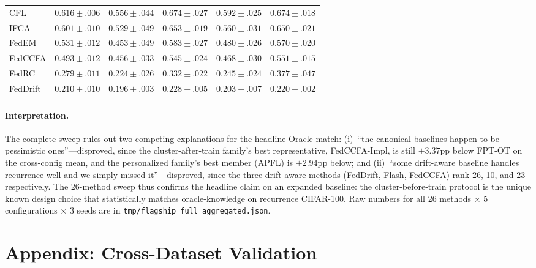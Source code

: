 \begin{table}[h]
\begin{tabular}{lrrrrr}
CFL               & $0.616 \pm .006$ & $0.556 \pm .044$ & $0.674 \pm .027$ & $0.592 \pm .025$ & $0.674 \pm .018$ \\
IFCA              & $0.601 \pm .010$ & $0.529 \pm .049$ & $0.653 \pm .019$ & $0.560 \pm .031$ & $0.650 \pm .021$ \\
FedEM             & $0.531 \pm .012$ & $0.453 \pm .049$ & $0.583 \pm .027$ & $0.480 \pm .026$ & $0.570 \pm .020$ \\
FedCCFA           & $0.493 \pm .012$ & $0.456 \pm .033$ & $0.545 \pm .024$ & $0.468 \pm .030$ & $0.551 \pm .015$ \\
FedRC             & $0.279 \pm .011$ & $0.224 \pm .026$ & $0.332 \pm .022$ & $0.245 \pm .024$ & $0.377 \pm .047$ \\
FedDrift          & $0.210 \pm .010$ & $0.196 \pm .003$ & $0.228 \pm .005$ & $0.203 \pm .007$ & $0.220 \pm .002$ \\
\bottomrule
\end{tabular}
\end{table}

\paragraph{Interpretation.}
The complete sweep rules out two competing explanations for the headline Oracle-match: (i)~``the canonical baselines happen to be pessimistic ones''---disproved, since the cluster-after-train family's best representative, FedCCFA-Impl, is still $+3.37$pp below FPT-OT on the cross-config mean, and the personalized family's best member (APFL) is $+2.94$pp below; and (ii)~``some drift-aware baseline handles recurrence well and we simply missed it''---disproved, since the three drift-aware methods (FedDrift, Flash, FedCCFA) rank 26, 10, and 23 respectively. The 26-method sweep thus confirms the headline claim on an expanded baseline: the cluster-before-train protocol is the unique known design choice that statistically matches oracle-knowledge on recurrence CIFAR-100. Raw numbers for all 26 methods $\times$ 5 configurations $\times$ 3 seeds are in \texttt{tmp/flagship\_full\_aggregated.json}.


\section*{Appendix: Cross-Dataset Validation}
\label{app:cross_dataset}

